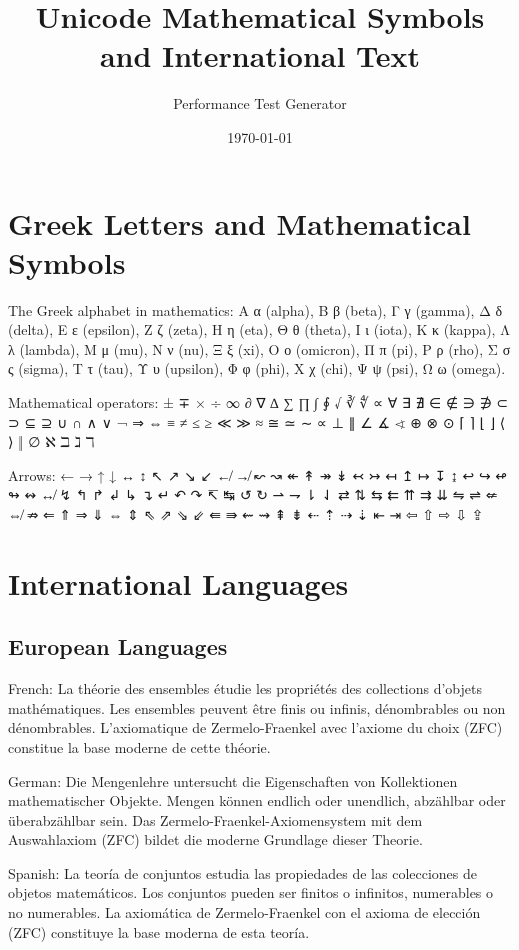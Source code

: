 \documentclass[12pt]{article}
\begin{document}
\title{Unicode Mathematical Symbols and International Text}
\author{Performance Test Generator}
\date{\today}
\maketitle

\section{Greek Letters and Mathematical Symbols}

The Greek alphabet in mathematics: Α α (alpha), Β β (beta), Γ γ (gamma), Δ δ (delta), Ε ε (epsilon), Ζ ζ (zeta), Η η (eta), Θ θ (theta), Ι ι (iota), Κ κ (kappa), Λ λ (lambda), Μ μ (mu), Ν ν (nu), Ξ ξ (xi), Ο ο (omicron), Π π (pi), Ρ ρ (rho), Σ σ ς (sigma), Τ τ (tau), Υ υ (upsilon), Φ φ (phi), Χ χ (chi), Ψ ψ (psi), Ω ω (omega).

Mathematical operators: ± ∓ × ÷ ∞ ∂ ∇ ∆ ∑ ∏ ∫ ∮ √ ∛ ∜ ∝ ∀ ∃ ∄ ∈ ∉ ∋ ∌ ⊂ ⊃ ⊆ ⊇ ∪ ∩ ∧ ∨ ¬ ⇒ ⇔ ≡ ≠ ≤ ≥ ≪ ≫ ≈ ≅ ≃ ∼ ∝ ⊥ ∥ ∠ ∡ ∢ ⊕ ⊗ ⊙ ⌈ ⌉ ⌊ ⌋ ⟨ ⟩ ‖ ∅ ℵ ℶ ℷ ℸ

Arrows: ← → ↑ ↓ ↔ ↕ ↖ ↗ ↘ ↙ ↚ ↛ ↜ ↝ ↞ ↟ ↠ ↡ ↢ ↣ ↤ ↥ ↦ ↧ ↨ ↩ ↪ ↫ ↬ ↭ ↮ ↯ ↰ ↱ ↲ ↳ ↴ ↵ ↶ ↷ ↸ ↹ ↺ ↻ ⇀ ⇁ ⇂ ⇃ ⇄ ⇅ ⇆ ⇇ ⇈ ⇉ ⇊ ⇋ ⇌ ⇍ ⇎ ⇏ ⇐ ⇑ ⇒ ⇓ ⇔ ⇕ ⇖ ⇗ ⇘ ⇙ ⇚ ⇛ ⇜ ⇝ ⇞ ⇟ ⇠ ⇡ ⇢ ⇣ ⇤ ⇥ ⇦ ⇧ ⇨ ⇩ ⇪

\section{International Languages}

\subsection{European Languages}

French: La théorie des ensembles étudie les propriétés des collections d'objets mathématiques. Les ensembles peuvent être finis ou infinis, dénombrables ou non dénombrables. L'axiomatique de Zermelo-Fraenkel avec l'axiome du choix (ZFC) constitue la base moderne de cette théorie.

German: Die Mengenlehre untersucht die Eigenschaften von Kollektionen mathematischer Objekte. Mengen können endlich oder unendlich, abzählbar oder überabzählbar sein. Das Zermelo-Fraenkel-Axiomensystem mit dem Auswahlaxiom (ZFC) bildet die moderne Grundlage dieser Theorie.

Spanish: La teoría de conjuntos estudia las propiedades de las colecciones de objetos matemáticos. Los conjuntos pueden ser finitos o infinitos, numerables o no numerables. La axiomática de Zermelo-Fraenkel con el axioma de elección (ZFC) constituye la base moderna de esta teoría.
\end{document}
